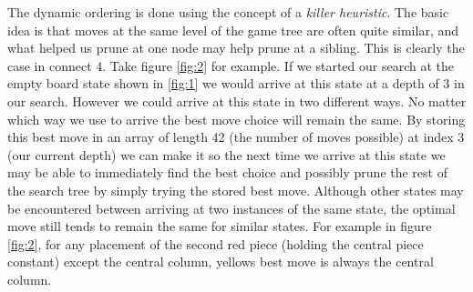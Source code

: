 \documentclass{article}
\begin{document}
The dynamic ordering is done using the concept of a \emph{killer heuristic}. The basic idea is that moves at the same level of the game tree are often quite similar, and what helped us prune at one node may help prune at a sibling. This is clearly the case in connect 4. Take figure \ref{fig:2} for example. If we started our search at the empty board state shown in \ref{fig:1} we would arrive at this state at a depth of 3 in our search. However we could arrive at this state in two different ways. No matter which way we use to arrive the best move choice will remain the same. By storing this best move in an array of length 42 (the number of moves possible) at index 3 (our current depth) we can make it so the next time we arrive at this state we may be able to immediately find the best choice and possibly prune the rest of the search tree by simply trying the stored best move. Although other states may be encountered between arriving at two instances of the same state, the optimal move still tends to remain the same for similar states. For example in figure \ref{fig:2}, for any placement of the second red piece (holding the central piece constant) except the central column, yellows best move is always the central column.
\end{document}

